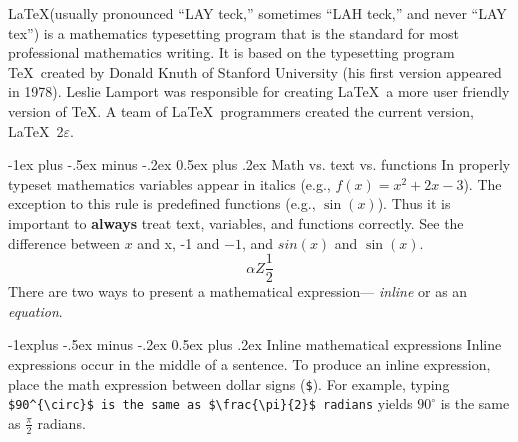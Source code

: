 \documentclass[10pt,landscape]{article}
\makeatletter
\renewcommand{\section}{\@startsection{section}{1}{0mm}%
                                {-1ex plus -.5ex minus -.2ex}%
                                {0.5ex plus .2ex}%
                                {\normalfont\large\bfseries}}
\renewcommand{\subsection}{\@startsection{subsection}{2}{0mm}%
                                {-1explus -.5ex minus -.2ex}%
                                {0.5ex plus .2ex}%
                                {\normalfont\normalsize\bfseries}}
\makeatother
\begin{document}
\begin{multicols}{3}
    \LaTeX (usually pronounced ``LAY teck,'' sometimes ``LAH teck,'' and never ``LAY tex'') is a mathematics typesetting program that is the standard for most professional mathematics writing. It is based on the typesetting program \TeX\ created by Donald Knuth of Stanford University (his first version appeared in 1978). Leslie Lamport was responsible for creating \LaTeX\, a more user friendly version of \TeX. A team of \LaTeX\ programmers created the current version,  \LaTeX\ 2$\varepsilon$.

    \section{Math vs. text vs. functions}
    In properly typeset mathematics  variables appear in italics (e.g., $f(x)=x^{2}+2x-3$). The exception to this rule is predefined functions (e.g., $\sin (x)$). Thus it is important to \textbf{always} treat text, variables, and functions correctly. See the difference between $x$ and x, -1 and $-1$, and $sin(x)$ and $\sin(x)$.
    \[ \alpha Z \frac{1}{2}\]
    There are two ways to present a mathematical expression--- \emph{inline} or as an \emph{equation}.

    \subsection{Inline mathematical expressions}
    Inline expressions occur in the middle of a sentence.  To produce an inline expression, place the math expression between dollar signs (\verb!$!).  For example, typing \verb!$90^{\circ}$ is the same as $\frac{\pi}{2}$ radians!  yields $90^{\circ}$ is the same as $\frac{\pi}{2}$ radians.


\end{multicols}
\end{document}
